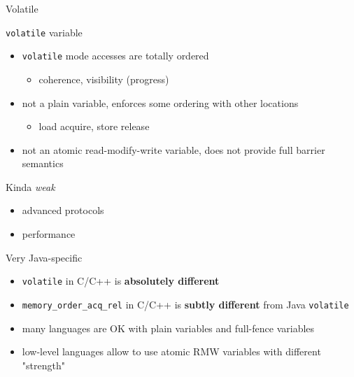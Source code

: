 \begin{frame}[t,fragile]{Volatile}

\texttt{volatile} variable
\begin{itemize}
  \item \texttt{volatile} mode accesses are totally ordered
  \begin{itemize}
    \item coherence, visibility (progress)
  \end{itemize}
  \item not a plain variable, enforces some ordering with other locations 
  \begin{itemize}
    \item load acquire, store release
  \end{itemize}
  \item not an atomic read-modify-write variable, does not provide full barrier semantics
\end{itemize}

\pause
Kinda \textit{weak}
\begin{itemize}
  \item advanced protocols
  \item performance
\end{itemize}

\pause

Very Java-specific
\begin{itemize}
  \item \texttt{volatile} in C/C++ is \textbf{absolutely different}
  \item \texttt{memory\_order\_acq\_rel} in C/C++ is \textbf{subtly different} from Java \texttt{volatile}
  \item many languages are OK with plain variables and full-fence variables
  \item low-level languages allow to use atomic RMW variables with different "strength"  
\end{itemize}

\end{frame}


